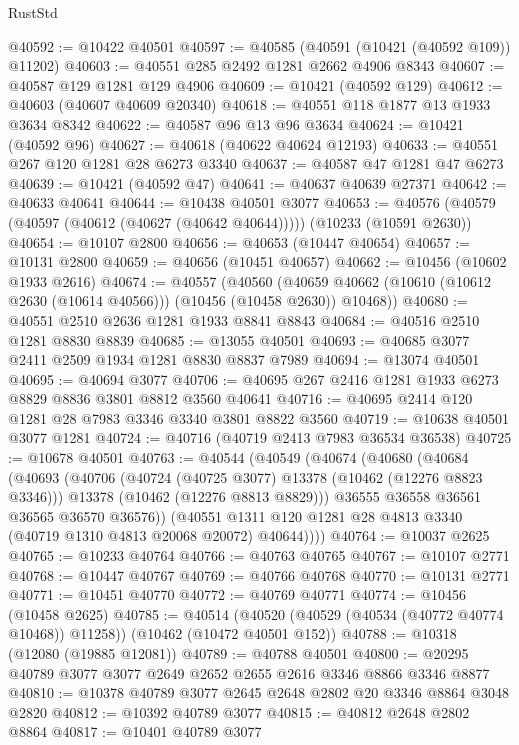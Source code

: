 \begin{lexlean}{RustStd}
\begin{coremodule}
@40592 := @10422 @40501
@40597 := @40585 (@40591 (@10421 (@40592 @109)) @11202)
@40603 := @40551 @285 @2492 @1281 @2662 @4906 @8343
@40607 := @40587 @129 @1281 @129 @4906
@40609 := @10421 (@40592 @129)
@40612 := @40603 (@40607 @40609 @20340)
@40618 := @40551 @118 @1877 @13 @1933 @3634 @8342
@40622 := @40587 @96 @13 @96 @3634
@40624 := @10421 (@40592 @96)
@40627 := @40618 (@40622 @40624 @12193)
@40633 := @40551 @267 @120 @1281 @28 @6273 @3340
@40637 := @40587 @47 @1281 @47 @6273
@40639 := @10421 (@40592 @47)
@40641 := @40637 @40639 @27371
@40642 := @40633 @40641
@40644 := @10438 @40501 @3077
@40653 := @40576 (@40579 (@40597 (@40612 (@40627 (@40642 @40644))))) (@10233 (@10591 @2630))
@40654 := @10107 @2800
@40656 := @40653 (@10447 @40654)
@40657 := @10131 @2800
@40659 := @40656 (@10451 @40657)
@40662 := @10456 (@10602 @1933 @2616)
@40674 := @40557
    (@40560 (@40659 @40662 (@10610 (@10612 @2630 (@10614 @40566))) (@10456 (@10458 @2630)) @10468))
@40680 := @40551 @2510 @2636 @1281 @1933 @8841 @8843
@40684 := @40516 @2510 @1281 @8830 @8839
@40685 := @13055 @40501
@40693 := @40685 @3077 @2411 @2509 @1934 @1281 @8830 @8837 @7989
@40694 := @13074 @40501
@40695 := @40694 @3077
@40706 := @40695 @267 @2416 @1281 @1933 @6273 @8829 @8836 @3801 @8812 @3560 @40641
@40716 := @40695 @2414 @120 @1281 @28 @7983 @3346 @3340 @3801 @8822 @3560
@40719 := @10638 @40501 @3077 @1281
@40724 := @40716 (@40719 @2413 @7983 @36534 @36538)
@40725 := @10678 @40501
@40763 := @40544
    (@40549
      (@40674
        (@40680
          (@40684
            (@40693
              (@40706
                (@40724 (@40725 @3077) @13378 (@10462 (@12276 @8823 @3346)))
                @13378
                (@10462 (@12276 @8813 @8829)))
              @36555
              @36558
              @36561
              @36565
              @36570
              @36576))
          (@40551 @1311 @120 @1281 @28 @4813 @3340 (@40719 @1310 @4813 @20068 @20072) @40644))))
@40764 := @10037 @2625
@40765 := @10233 @40764
@40766 := @40763 @40765
@40767 := @10107 @2771
@40768 := @10447 @40767
@40769 := @40766 @40768
@40770 := @10131 @2771
@40771 := @10451 @40770
@40772 := @40769 @40771
@40774 := @10456 (@10458 @2625)
@40785 := @40514
    (@40520 (@40529 (@40534 (@40772 @40774 @10468)) @11258))
    (@10462 (@10472 @40501 @152))
@40788 := @10318 (@12080 (@19885 @12081))
@40789 := @40788 @40501
@40800 := @20295 @40789 @3077 @3077 @2649 @2652 @2655 @2616 @3346 @8866 @3346 @8877
@40810 := @10378 @40789 @3077 @2645 @2648 @2802 @20 @3346 @8864 @3048 @2820
@40812 := @10392 @40789 @3077
@40815 := @40812 @2648 @2802 @8864
@40817 := @10401 @40789 @3077

\end{coremodule}
\end{lexlean}
